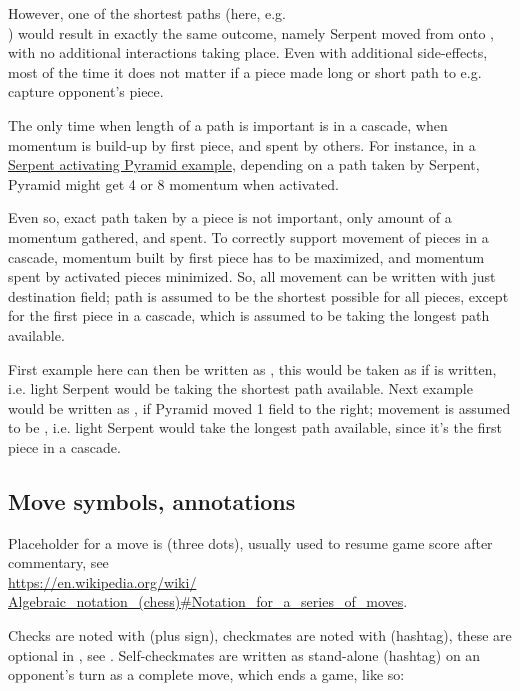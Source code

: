 However, one of the shortest paths (here, e.g. \\
) would result in exactly the same outcome, namely Serpent moved from
 onto , with no additional interactions taking place. Even with additional
side-effects, most of the time it does not matter if a piece made long or short path to e.g.
capture opponent's piece.

The only time when length of a path is important is in a cascade, when momentum is build-up
by first piece, and spent by others. For instance, in a
\hyperref[fig:scn_tr_06_serpent_loop_1]{Serpent activating Pyramid example}, depending on
a path taken by Serpent, Pyramid might get 4 or 8 momentum when activated.

Even so, exact path taken by a piece is not important, only amount of a momentum gathered,
and spent. To correctly support movement of pieces in a cascade, momentum built by first
piece has to be maximized, and momentum spent by activated pieces minimized. So, all movement
can be written with just destination field; path is assumed to be the shortest possible for
all pieces, except for the first piece in a cascade, which is assumed to be taking the longest
path available.

First example here can then be written as , this would be taken as if
 is written, i.e. light Serpent would be taking the shortest path
available. Next example would be written as , if Pyramid moved 1 field
to the right; movement is assumed to be ,
i.e. light Serpent would take the longest path available, since it's the first piece in
a cascade.

\subsection*{Move symbols, annotations}
\label{sec:Appendix/Notation/Move symbols, annotations}

Placeholder for a move is  (three dots), usually used to resume game score
after commentary, see \\
\href{https://en.wikipedia.org/wiki/Algebraic\_notation\_(chess)\#Notation\_for\_a\_series\_of\_moves}
{https://en.wikipedia.org/wiki/\\
Algebraic\_notation\_(chess)\#Notation\_for\_a\_series\_of\_moves}.

Checks are noted with \alg{+} (plus sign), checkmates are noted with \alg{\#} (hashtag),
these are optional in , see . Self-checkmates are written
as stand-alone \alg{\#} (hashtag) on an opponent's turn as a complete move, which ends
a game, like so:

